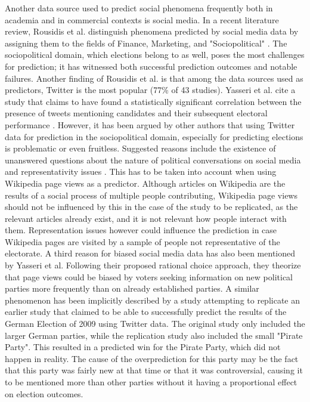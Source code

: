Another data source used to predict social phenomena frequently both in academia and in commercial contexts is social media. In a recent literature review, Rousidis et al. distinguish phenomena predicted by social media data by assigning them to the fields of Finance, Marketing, and "Sociopolitical" \cite{Rousidis2020Mar}. The sociopolitical domain, which elections belong to as well, poses the most challenges for prediction; it has witnessed both successful prediction outcomes and notable failures. Another finding of Rousidis et al. is that among the data sources used as predictors, Twitter is the most popular (77\% of 43 studies). Yasseri et al. cite a study that claims to have found a statistically significant correlation between the presence of tweets mentioning candidates and their subsequent electoral performance \cite{DiGrazia2013Nov}. However, it has been argued by other authors that using Twitter data for prediction in the sociopolitical domain, especially for predicting elections is problematic or even fruitless. Suggested reasons include the existence of unanswered questions about the nature of political conversations on social media and representativity issues \cite{Gayo-Avello2011}. This has to be taken into account when using Wikipedia page views as a predictor. Although articles on Wikipedia are the results of a social process of multiple people contributing, Wikipedia page views should not be influenced by this in the case of the study to be replicated, as the relevant articles already exist, and it is not relevant how people interact with them. Representation issues however could influence the prediction in case Wikipedia pages are visited by a sample of people not representative of the electorate. A third reason for biased social media data has also been mentioned by  Yasseri et al. Following their proposed rational choice approach, they theorize that page views could be biased by voters seeking information on new political parties more frequently than on already established parties. A similar phenomenon has been implicitly described by a study \cite{Jungherr2011Apr} attempting to replicate an earlier study \cite{Tumasjan2010May} that claimed to be able to successfully predict the results of the German Election of 2009 using Twitter data. The original study only included the larger German parties, while the replication study also included the small "Pirate Party". This resulted in a predicted win for the Pirate Party, which did not happen in reality. The cause of the overprediction for this party may be the fact that this party was fairly new at that time or that it was controversial, causing it to be mentioned more than other parties without it having a proportional effect on election outcomes. \par
